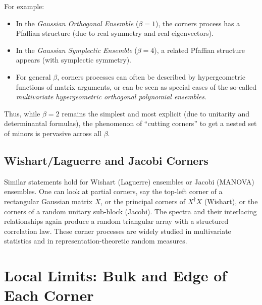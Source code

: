\documentclass[letterpaper,11pt,oneside,reqno]{article}
\numberwithin{equation}{section}
\theoremstyle{definition}
\begin{document}
For example:
\begin{itemize}
\item In the \emph{Gaussian Orthogonal Ensemble} ($\beta=1$), the corners process has a Pfaffian structure (due to real symmetry and real eigenvectors).
\item In the \emph{Gaussian Symplectic Ensemble} ($\beta=4$), a related Pfaffian structure appears (with symplectic symmetry).
\item For general $\beta$, corners processes can often be described by hypergeometric functions of matrix arguments, or can be seen as special cases of the so-called \emph{multivariate hypergeometric orthogonal polynomial ensembles}.
\end{itemize}
Thus, while $\beta=2$ remains the simplest and most explicit (due to unitarity and determinantal formulas), the phenomenon of ``cutting corners'' to get a nested set of minors is pervasive across all $\beta$.

\subsection{Wishart/Laguerre and Jacobi Corners}
Similar statements hold for Wishart (Laguerre) ensembles or Jacobi (MANOVA) ensembles. One can look at partial corners, say the top-left corner of a rectangular Gaussian matrix $X$, or the principal corners of $X^\dagger X$ (Wishart), or the corners of a random unitary sub-block (Jacobi). The spectra and their interlacing relationships again produce a random triangular array with a structured correlation law. These corner processes are widely studied in multivariate statistics and in representation-theoretic random measures.

\section{Local Limits: Bulk and Edge of Each Corner}
\label{sec:local-limits}
\end{document}
